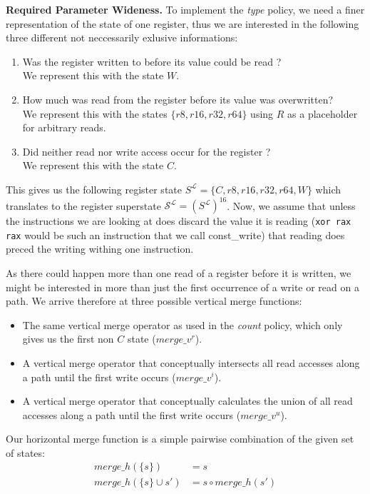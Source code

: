 \textbf{Required Parameter Wideness.}
\label{subsection:requiredparamwideness}
To implement the \emph{type} policy, we need a finer representation of the state of one register, thus we are interested in the following three different not neccessarily exlusive informations:
\begin{enumerate}
\item Was the register written to before its value could be read ? \\ We represent this with the state $W$.
\item How much was read from the register before its value was overwritten? \\ We represent this with the states $\{ r8, r16, r32, r64 \}$ using $R$ as a placeholder for arbitrary reads.
\item Did neither read nor write access occur for the register ? \\ We represent this with the state $C$.
\end{enumerate}
This gives us the following register state $S^\mathcal{L} = \{ C, r8, r16, r32, r64, W \}$ which translates to the register superstate $\mathcal{S}^\mathcal{L} = (S^\mathcal{L})^{16}$.
Now, we assume that unless the instructions we are looking at does discard the value it is reading (\texttt{xor rax rax} would be such an instruction that we call const\_write) that reading does preced the writing withing one instruction.

As there could happen more than one read of a register before it is written, we might be interested in more than just the first occurrence of a write or read on a path. We arrive therefore at three possible vertical merge functions:
\begin{itemize}
	\item The same vertical merge operator as used in the \emph{count} policy, which only gives us the first non $C$ state ($merge\_v^{r}$).
	\item A vertical merge operator that conceptually intersects all read accesses along a path until the first write occurs ($merge\_v^{i}$).
	\item A vertical merge operator that conceptually calculates the union of all read accesses along a path until the first write occurs ($merge\_v^{u}$).
\end{itemize}

Our horizontal merge function is a simple pairwise combination of the given set of states:
\begin{align}
merge\_h(\{s\}) &= s\\
merge\_h(\{s\} \cup s') &= s \circ merge\_h(s')
\end{align}

